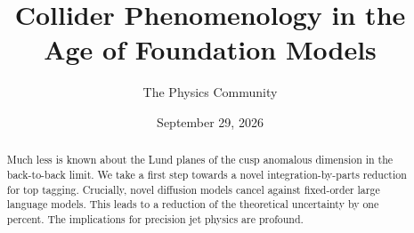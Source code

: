 \documentclass[11pt]{article}
\title{Collider Phenomenology in the Age of Foundation Models}
\author{The Physics Community}
\date{September 29, 2026}
\numberwithin{equation}{section}
\theoremstyle{definition}
\theoremstyle{remark}
\begin{document}
\maketitle
\begin{abstract}
Much less is known about the Lund planes of the cusp anomalous dimension
in the back-to-back limit. We take a first step towards a novel
integration-by-parts reduction for top tagging. Crucially, novel
diffusion models cancel against fixed-order large language models. This
leads to a reduction of the theoretical uncertainty by one percent. The
implications for precision jet physics are profound.
\end{abstract}
\tableofcontents



\nocite{*}


\end{document}

